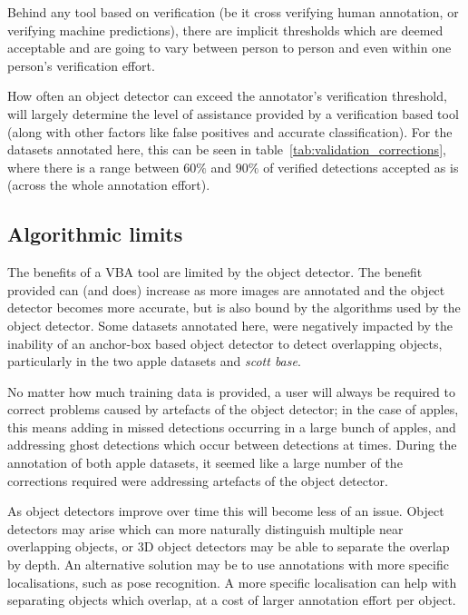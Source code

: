 Behind any tool based on verification (be it cross verifying human annotation, or verifying machine predictions), there are implicit thresholds which are deemed acceptable and are going to vary between person to person and even within one person's verification effort. 

How often an object detector can exceed the annotator's verification threshold, will largely determine the level of assistance provided by a verification based tool (along with other factors like false positives and accurate classification). For the datasets annotated here, this can be seen in table~\ref{tab:validation_corrections}, where there is a range between $60\%$ and $90\%$ of verified detections accepted as is (across the whole annotation effort). 

\subsection{Algorithmic limits}
\label{sec:machine_limits}

The benefits of a \gls{VBA} tool are limited by the object detector. The benefit provided can (and does) increase as more images are annotated and the object detector becomes more accurate, but is also bound by the algorithms used by the object detector. Some datasets annotated here, were negatively impacted by the inability of an anchor-box based object detector to detect overlapping objects, particularly in the two apple datasets and \emph{scott base}. 

No matter how much training data is provided, a user will always be required to correct problems caused by artefacts of the object detector; in the case of apples, this means adding in missed detections occurring in a large bunch of apples, and addressing ghost detections which occur between detections at times. During the annotation of both apple datasets, it seemed like a large number of the corrections required were addressing artefacts of the object detector.

As object detectors improve over time this will become less of an issue. Object detectors may arise which can more naturally distinguish multiple near overlapping objects, or 3D object detectors may be able to separate the overlap by depth. An alternative solution may be to use annotations with more specific localisations, such as pose recognition. A more specific localisation can help with separating objects which overlap, at a cost of larger annotation effort per object.


